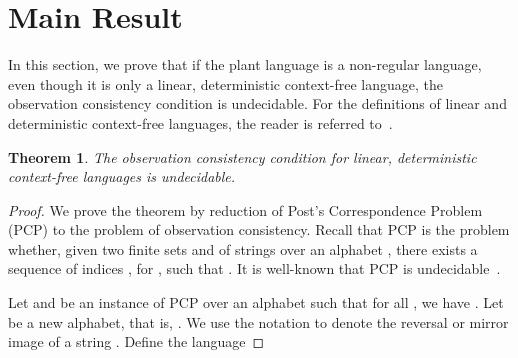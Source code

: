 \documentclass[preprint,1p,times]{elsarticle}
\newtheorem{theorem}{Theorem}
\begin{document}
\section{Main Result}
  In this section, we prove that if the plant language  is a non-regular language, even though it is only a linear, deterministic context-free language, the observation consistency condition is undecidable. For the definitions of linear and deterministic context-free languages, the reader is referred to~\cite{salomaa}.
  
  \begin{theorem}
    The observation consistency condition for linear, deterministic context-free languages is undecidable.
  \end{theorem}
  \begin{proof}
    We prove the theorem by reduction of Post's Correspondence Problem (PCP) to the problem of observation consistency. Recall that PCP is the problem whether, given two finite sets  and  of  strings over an alphabet , there exists a sequence of indices , for , such that . It is well-known that PCP is undecidable~\cite{post}.
    
    Let  and  be an instance of PCP over an alphabet  such that for all , we have . Let  be a new alphabet, that is, . We use the notation  to denote the reversal or mirror image of a string . Define the language 
    

\end{proof}
\end{document}
